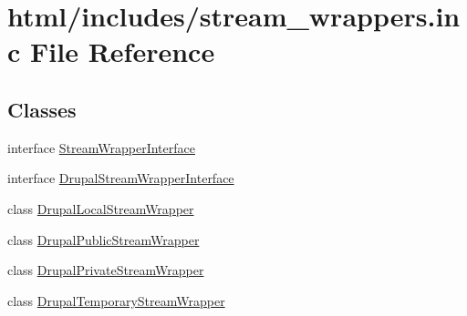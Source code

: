 \hypertarget{stream__wrappers_8inc}{
\section{html/includes/stream\_\-wrappers.inc File Reference}
\label{stream__wrappers_8inc}
}
\subsection*{Classes}
\begin{DoxyCompactItemize}
\item 
interface \hyperlink{interfaceStreamWrapperInterface}{StreamWrapperInterface}
\item 
interface \hyperlink{interfaceDrupalStreamWrapperInterface}{DrupalStreamWrapperInterface}
\item 
class \hyperlink{classDrupalLocalStreamWrapper}{DrupalLocalStreamWrapper}
\item 
class \hyperlink{classDrupalPublicStreamWrapper}{DrupalPublicStreamWrapper}
\item 
class \hyperlink{classDrupalPrivateStreamWrapper}{DrupalPrivateStreamWrapper}
\item 
class \hyperlink{classDrupalTemporaryStreamWrapper}{DrupalTemporaryStreamWrapper}
\end{DoxyCompactItemize}
